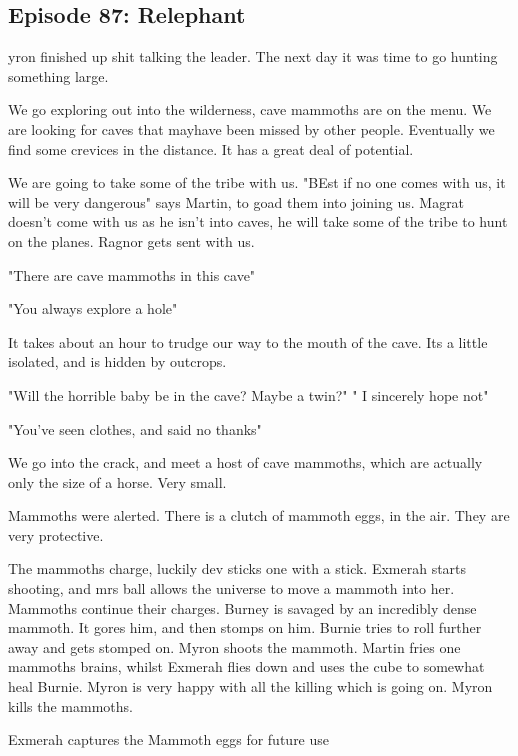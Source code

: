 \subsection{Episode 87: Relephant}

yron finished up shit talking the leader. The next day it was time to go hunting something large.\medskip

We go exploring out into the wilderness, cave mammoths are on the menu. We are looking for caves that mayhave been missed by other people. Eventually we find some crevices in the distance. It has a great deal of potential.\medskip

We are going to take some of the tribe with us. "BEst if no one comes with us, it will be very dangerous" says Martin, to goad them into joining us. Magrat doesn't come with us as he isn't into caves, he will take some of the tribe to hunt on the planes. Ragnor gets sent with us.\medskip

"There are cave mammoths in this cave"\medskip

"You always explore a hole"\medskip

It takes about an hour to trudge our way to the mouth of the cave. Its a little isolated, and is hidden by outcrops.\medskip

"Will the horrible baby be in the cave? Maybe a twin?" " I sincerely hope not"\medskip

"You've seen clothes, and said no thanks"\medskip

We go into the crack, and meet a host of cave mammoths, which are actually only the size of a horse. Very small.\medskip

Mammoths were alerted. There is a clutch of mammoth eggs, in the air. They are very protective.\medskip

The mammoths charge, luckily dev sticks one with a stick. Exmerah starts shooting, and mrs ball allows the universe to move a mammoth into her. Mammoths continue their charges. Burney is savaged by an incredibly dense mammoth. It gores him, and then stomps on him. Burnie tries to roll further away and gets stomped on. Myron shoots the mammoth. Martin fries one mammoths brains, whilst Exmerah flies down and uses the cube to somewhat heal Burnie. Myron is very happy with all the killing which is going on. Myron kills the mammoths.\medskip

Exmerah captures the Mammoth eggs for future use\medskip

\vspace*{5mm}

